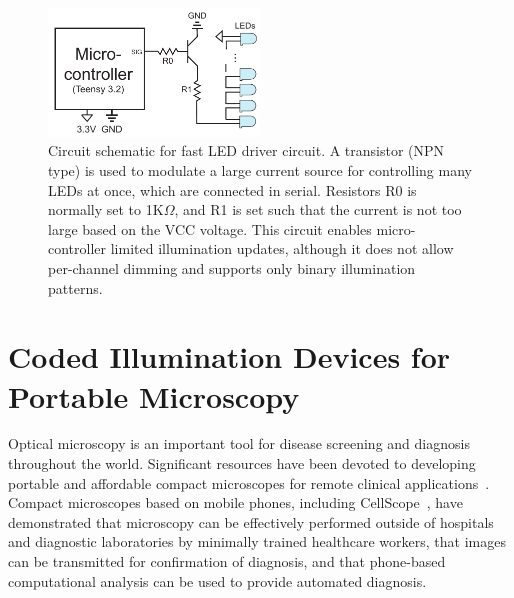 \begin{figure}
    \centering
    \includegraphics[width=0.5\textwidth]{figures/fig_fabrication_fast_circuit.pdf}
    \caption{Circuit schematic for fast LED driver circuit. A transistor (NPN type) is used to modulate a large current source for controlling many LEDs at once, which are connected in serial. Resistors R0 is normally set to 1K$\Omega$, and R1 is set such that the current is not too large based on the VCC voltage. This circuit enables micro-controller limited illumination updates, although it does not allow per-channel dimming and supports only binary illumination patterns.}\label{fig:fabrication_highthroughput_circuit}
\end{figure}

\section{Coded Illumination Devices for Portable Microscopy}
Optical microscopy is an important tool for disease screening and diagnosis throughout the world. Significant resources have been devoted to developing portable and affordable compact microscopes for remote clinical applications~\cite{Zhu2011, switz2014low, smith2011cell, maamari2013mobile,C4LC00010B,Vashist2014, steenblik2005lenses, cybulski2014foldscope, boppart2014point, Greenbaum17122014, mudanyali2010compact, tseng2010lensfree}. 
Compact microscopes based on mobile phones, including CellScope~\cite{breslauer2009mobile, skandarajah2014quantitative}, have demonstrated that microscopy can be effectively performed outside of hospitals and diagnostic laboratories by minimally trained healthcare workers, that images can be transmitted for confirmation of diagnosis, and that phone-based computational analysis can be used to provide automated diagnosis.

